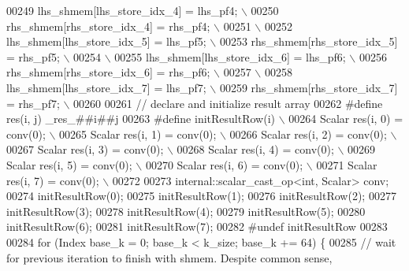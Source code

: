 \begin{DoxyCode}
00249 \textcolor{preprocessor}{  lhs\_shmem[lhs\_store\_idx\_4] = lhs\_pf4;         \(\backslash\)}
00250 \textcolor{preprocessor}{  rhs\_shmem[rhs\_store\_idx\_4] = rhs\_pf4;         \(\backslash\)}
00251 \textcolor{preprocessor}{                                                \(\backslash\)}
00252 \textcolor{preprocessor}{  lhs\_shmem[lhs\_store\_idx\_5] = lhs\_pf5;         \(\backslash\)}
00253 \textcolor{preprocessor}{  rhs\_shmem[rhs\_store\_idx\_5] = rhs\_pf5;         \(\backslash\)}
00254 \textcolor{preprocessor}{                                                \(\backslash\)}
00255 \textcolor{preprocessor}{  lhs\_shmem[lhs\_store\_idx\_6] = lhs\_pf6;         \(\backslash\)}
00256 \textcolor{preprocessor}{  rhs\_shmem[rhs\_store\_idx\_6] = rhs\_pf6;         \(\backslash\)}
00257 \textcolor{preprocessor}{                                                \(\backslash\)}
00258 \textcolor{preprocessor}{  lhs\_shmem[lhs\_store\_idx\_7] = lhs\_pf7;         \(\backslash\)}
00259 \textcolor{preprocessor}{  rhs\_shmem[rhs\_store\_idx\_7] = rhs\_pf7;         \(\backslash\)}
00260 \textcolor{preprocessor}{}
00261   \textcolor{comment}{// declare and initialize result array}
00262 \textcolor{preprocessor}{#define res(i, j) \_res\_##i##j}
00263 \textcolor{preprocessor}{#define initResultRow(i)                        \(\backslash\)}
00264 \textcolor{preprocessor}{  Scalar res(i, 0) = conv(0);                   \(\backslash\)}
00265 \textcolor{preprocessor}{  Scalar res(i, 1) = conv(0);                   \(\backslash\)}
00266 \textcolor{preprocessor}{  Scalar res(i, 2) = conv(0);                   \(\backslash\)}
00267 \textcolor{preprocessor}{  Scalar res(i, 3) = conv(0);                   \(\backslash\)}
00268 \textcolor{preprocessor}{  Scalar res(i, 4) = conv(0);                   \(\backslash\)}
00269 \textcolor{preprocessor}{  Scalar res(i, 5) = conv(0);                   \(\backslash\)}
00270 \textcolor{preprocessor}{  Scalar res(i, 6) = conv(0);                   \(\backslash\)}
00271 \textcolor{preprocessor}{  Scalar res(i, 7) = conv(0);                   \(\backslash\)}
00272 \textcolor{preprocessor}{}
00273   internal::scalar\_cast\_op<int, Scalar> conv;
00274   initResultRow(0);
00275   initResultRow(1);
00276   initResultRow(2);
00277   initResultRow(3);
00278   initResultRow(4);
00279   initResultRow(5);
00280   initResultRow(6);
00281   initResultRow(7);
00282 \textcolor{preprocessor}{#undef initResultRow}
00283 
00284   \textcolor{keywordflow}{for} (Index base\_k = 0; base\_k < k\_size; base\_k += 64) \{
00285     \textcolor{comment}{// wait for previous iteration to finish with shmem. Despite common sense,}

\end{DoxyCode}
